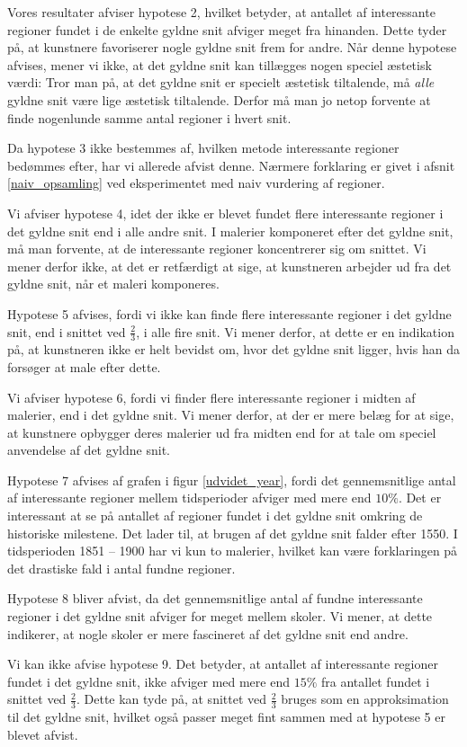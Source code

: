 {Vores resultater afviser hypotese 2, hvilket betyder, at antallet af
interessante regioner fundet i de enkelte gyldne snit afviger meget fra
hinanden.  Dette tyder på, at kunstnere favoriserer nogle gyldne snit
frem for andre. Når denne hypotese afvises, mener vi ikke, at det gyldne
snit kan tillægges nogen speciel æstetisk værdi: Tror man på, at det
gyldne snit er specielt æstetisk tiltalende, må \emph{alle} gyldne snit
være lige æstetisk tiltalende. Derfor må man jo netop forvente at finde
nogenlunde samme antal regioner i hvert snit.

Da hypotese 3 ikke bestemmes af, hvilken metode interessante regioner
bedømmes efter, har vi allerede afvist denne. Nærmere forklaring er
givet i afsnit \ref{naiv_opsamling} ved eksperimentet med naiv vurdering
af regioner.

Vi afviser hypotese 4, idet der ikke er blevet fundet flere interessante
regioner i det gyldne snit end i alle andre snit.  I malerier komponeret
efter det gyldne snit, må man forvente, at de interessante regioner
koncentrerer sig om snittet. Vi mener derfor ikke, at det er retfærdigt
at sige, at kunstneren arbejder ud fra det gyldne snit, når et maleri
komponeres.

Hypotese 5 afvises, fordi vi ikke kan finde flere interessante regioner
i det gyldne snit, end i snittet ved $\frac{2}{3}$, i alle fire snit. Vi
mener derfor, at dette er en indikation på, at kunstneren ikke er helt
bevidst om, hvor det gyldne snit ligger, hvis han da forsøger at male
efter dette.

Vi afviser hypotese 6, fordi vi finder flere interessante regioner i
midten af malerier, end i det gyldne snit.  Vi mener derfor, at der er
mere belæg for at sige, at kunstnere opbygger deres malerier ud fra
midten end for at tale om speciel anvendelse af det gyldne snit.

Hypotese 7 afvises af grafen i figur \ref{udvidet_year}, fordi det
gennemsnitlige antal af interessante regioner mellem tidsperioder
afviger med mere end $10 \%$. Det er interessant at se på antallet af
regioner fundet i det gyldne snit omkring de historiske milestene. Det
lader til, at brugen af det gyldne snit falder efter 1550. I tidsperioden
1851 -- 1900 har vi kun to malerier, hvilket kan være forklaringen på
det drastiske fald i antal fundne regioner.

Hypotese 8 bliver afvist, da det gennemsnitlige antal af fundne
interessante regioner i det gyldne snit afviger for meget mellem
skoler. Vi mener, at dette indikerer, at nogle skoler er mere
fascineret af det gyldne snit end andre.

Vi kan ikke afvise hypotese 9. Det betyder, at antallet af interessante
regioner fundet i det gyldne snit, ikke afviger med mere end $15 \%$ fra
antallet fundet i snittet ved $\frac{2}{3}$. Dette kan tyde på, at
snittet ved $\frac{2}{3}$ bruges som en approksimation til det gyldne
snit, hvilket også passer meget fint sammen med at hypotese 5 er blevet
afvist.

} %


